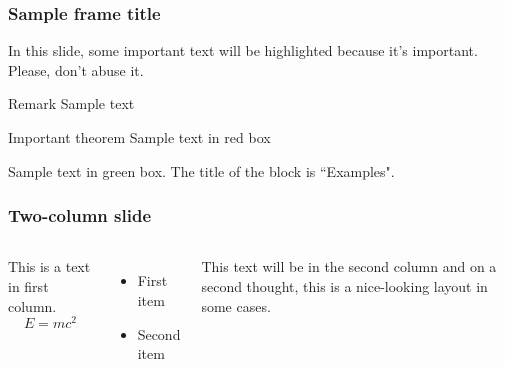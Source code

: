 \documentclass{beamer}
\begin{document}
\begin{frame}
\frametitle{Sample frame title}

In this slide, some important text will be
\alert{highlighted} because it's important.
Please, don't abuse it.

\begin{block}{Remark}
Sample text
\end{block}

\begin{alertblock}{Important theorem}
Sample text in red box
\end{alertblock}

\begin{examples}
Sample text in green box. The title of the block is ``Examples".
\end{examples}
\end{frame}



\begin{frame}
\frametitle{Two-column slide}

\begin{columns}

This is a text in first column.
$$E=mc^2$$
\begin{itemize}
\item First item
\item Second item
\end{itemize}

This text will be in the second column
and on a second thought, this is a nice-looking
layout in some cases.
\end{columns}
\end{frame}
\end{document}
